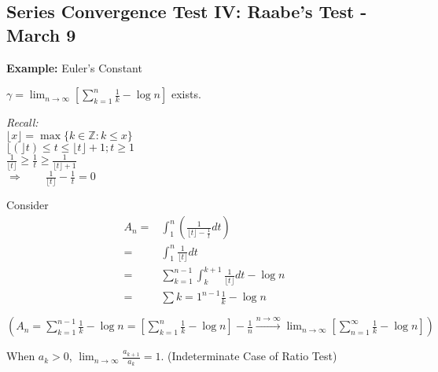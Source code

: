 \documentclass[12pt]{article}
\theoremstyle{plain}
\newcommand{\floor}[1]{\lfloor #1 \rfloor}
\newcommand{\mZ}{{\mathbb{Z}}}
\begin{document}
\subsection{Series Convergence Test IV: Raabe's Test - March 9}
{\color{Brown}
\textbf{Example:} Euler's Constant

$\gamma = \lim_{n\to\infty} [\sum_{k=1}^n \frac 1k - \log n]$ exists.

\textit{Recall:} \\
$\floor{x} = \max \{k \in \mZ : k \leq x\}$	\\
$\floor(t) \leq t \leq \floor{t} + 1; t \geq 1$\\
$\frac 1{\floor{t}} \geq \frac 1t \geq \frac 1{\floor{t} + 1}$	\\
$\Rightarrow \qquad \frac 1{\floor{t}} - \frac 1t = 0$

Consider 
\begin{align*}
	A_n 
	=& \int_1^n (\frac1{\floor t - \frac 1t} dt)	\\
	=& \int_1^n \frac1{\floor t} dt	\\
	=& \sum_{k=1}^{n-1} \int_k^{k+1} \frac1{\floor t}dt - \log n	\\
	=& \sum{k=1}^{n-1} \frac 1k - \log n	\\\\
\end{align*}
$(A_n = \sum_{k=1}^{n-1} \frac 1k - \log n = 
[\sum_{k=1}^n \frac 1k - \log n] - \frac 1n 
\overset{n\to\infty}{\longrightarrow} \lim_{n\to\infty} 
[\sum_{n=1}^{\infty} \frac 1k - \log n])$

When $a_k > 0$, $\lim_{n\to\infty} \frac{a_{k+1}}{a_k} = 1$. 
(Indeterminate Case of Ratio Test)	\\
}
\end{document}
